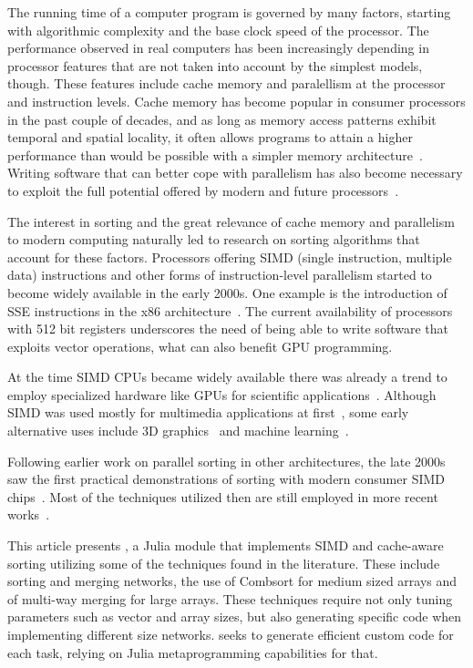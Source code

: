 \documentclass{juliacon}
\begin{document}
The running time of a computer program is governed by many factors, starting with algorithmic complexity and the base clock speed of the processor. The performance observed in real computers has been increasingly depending in processor features that are not taken into account by the simplest models, though. These features include cache memory and paralellism at the processor and instruction levels. Cache memory has become popular in consumer processors in the past couple of decades, and as long as memory access patterns exhibit temporal and spatial locality, it often allows programs to attain a higher performance than would be possible with a simpler memory architecture~\cite[Chapter 3]{Drepper07whatevery}. Writing software that can better cope with parallelism has also become necessary to exploit the full potential offered by modern and future processors~\cite{wilson2018}.

The interest in sorting and the great relevance of cache memory and parallelism to modern computing naturally led to research on sorting algorithms that account for these factors. Processors offering SIMD (single instruction, multiple data) instructions and other forms of instruction-level parallelism started to become widely available in the early 2000s. One example is the introduction of SSE instructions in the x86 architecture~\cite[Chapter 1]{kusswurm18}. The current availability of processors with 512 bit registers underscores the need of being able to write software that exploits vector operations, what can also benefit GPU programming.

At the time SIMD CPUs became widely available there was already a trend to employ specialized hardware like GPUs for scientific applications~\cite{larsen2001fast,DBLP:conf/micro/ThompsonHO02}. Although SIMD was used mostly for multimedia applications at first~\cite{CHEN2006509,DBLP:journals/mam/SlingerlandS05}, some early alternative uses include 3D graphics~\cite{DBLP:conf/pcm/MaY02} and machine learning~\cite{DBLP:conf/europar/StreyB01}.

Following earlier work on parallel sorting in other architectures, the late 2000s saw the first practical demonstrations of sorting with modern consumer SIMD chips~\cite{DBLP:conf/IEEEpact/InoueMKN07,DBLP:journals/pvldb/ChhuganiNLMHCBKD08}. Most of the techniques utilized then are still employed in more recent works~\cite{DBLP:journals/pvldb/BalkesenATO13,DBLP:journals/pvldb/InoueT15}.

This article presents \chipsort, a Julia module that implements SIMD and cache-aware sorting utilizing some of the techniques found in the literature. These include sorting and merging networks, the use of Combsort for medium sized arrays and of multi-way merging for large arrays. These techniques require not only tuning parameters such as vector and array sizes, but also generating specific code when implementing different size networks. \chipsort seeks to generate efficient custom code for each task, relying on Julia metaprogramming capabilities for that.
\end{document}
